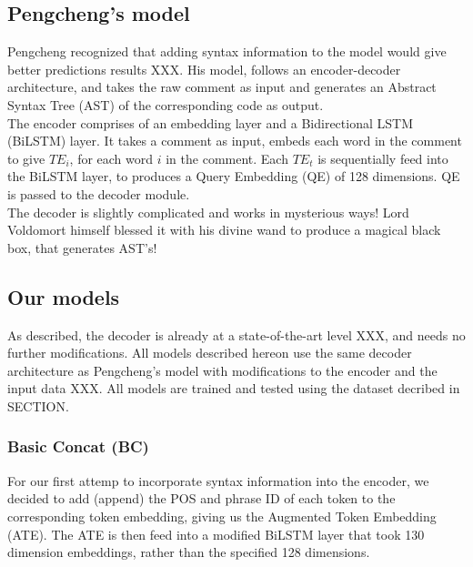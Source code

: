 \documentclass{IEEEtran}
\begin{document}
      \subsection{Pengcheng's model}
      Pengcheng recognized that adding syntax information to the model would give better
      predictions results XXX. His model, follows an encoder-decoder architecture, and takes
      the raw comment as input and generates an Abstract Syntax Tree (AST) of the corresponding 
      code as output. \\
      \hspace*{4mm}The encoder comprises of an embedding layer and a Bidirectional LSTM (BiLSTM)
      layer. It takes a comment as input, embeds each word in the comment to give 
      $ TE_i $, for each word $ i $ in the comment. Each $ TE_t $ is sequentially feed into the
      BiLSTM layer, to produces a Query Embedding (QE) of 128 dimensions. QE is passed to the
      decoder module. \\
      \hspace*{4mm}The decoder is slightly complicated and works in mysterious ways! Lord 
      Voldomort himself
      blessed it with his divine wand to produce a magical black box, that generates
      AST's! \\

      \subsection{Our models}
      As described, the decoder is already at a state-of-the-art level XXX, and needs no further 
      modifications. All models described hereon use the same decoder architecture as Pengcheng's 
      model with modifications to the encoder and the input data XXX. All models are trained and 
      tested using the dataset decribed in SECTION. %

        \subsubsection{Basic Concat (BC)}
        For our first attemp to incorporate syntax information into the encoder, we decided to 
        add (append) the POS and phrase ID of each token to the corresponding token embedding, 
        giving us the Augmented Token Embedding (ATE). The ATE is then feed into a modified BiLSTM
        layer that took 130 dimension embeddings, rather than the specified 128 dimensions. \\
\end{document}
